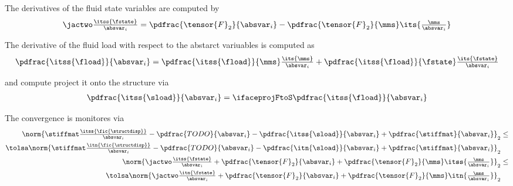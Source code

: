 \documentclass[../main.tex]{subfiles}
\begin{document}
The derivatives of the fluid state variables are computed by
\begin{align}
\jactwo \tfrac{\itss{\fstate}}{\absvar_i} =
\pdfrac{\tensor{F}_2}{\absvar_i} - \pdfrac{\tensor{F}_2}{\mms} \its{\tfrac{\mms}{\absvar_i}}
\end{align}


The derivative of the fluid load with respect to the abstarct variuables is computed as
\begin{align}\label{eq:deriv_floadBYabsvar}
\pdfrac{\itss{\fload}}{\absvar_i} =
\pdfrac{\itss{\fload}}{\mms}    \tfrac{\its{\mms}}   {\absvar_i} +
\pdfrac{\itss{\fload}}{\fstate} \tfrac{\its{\fstate}}{\absvar_i}
\end{align}

and compute project it onto the structure via
\begin{align}
\pdfrac{\itss{\sload}}{\absvar_i} = \ifaceprojFtoS \pdfrac{\itss{\fload}}{\absvar_i}
\end{align}

The convergence is monitores via
\begin{align}
\begin{split}
  \norm{ \stiffmat \tfrac{ \itss{\fic{\structdisp}} }{\absvar_i}  -  \pdfrac{TODO}{\absvar_i} - \pdfrac{\itss{\sload}}{\absvar_i}  +  \pdfrac{\stiffmat}{\absvar_i}}_{2} &
  \leq \\
  \tolsa \norm{ \stiffmat \tfrac{ \itn{\fic{\structdisp}}  }{\absvar_i}  -  \pdfrac{TODO}{\absvar_i} - \pdfrac{\itn{\sload}}{\absvar_i}  +  \pdfrac{\stiffmat}{\absvar_i}}_{2} &
\end{split} &
\\
\begin{split}
  \norm{\jactwo \tfrac{\itss{\fstate}}{\absvar_i} + \pdfrac{\tensor{F}_2}{\absvar_i} + \pdfrac{\tensor{F}_2}{\mms} \itss{\tfrac{\mms}{\absvar_i} }   }_{2} &
  \leq \\
  \tolsa \norm{\jactwo \tfrac{\itn{\fstate}}{\absvar_i} + \pdfrac{\tensor{F}_2}{\absvar_i} + \pdfrac{\tensor{F}_2}{\mms} \itn{\tfrac{\mms}{\absvar_i} }   }_{2} &
\end{split} &
\end{align}
\end{document}
